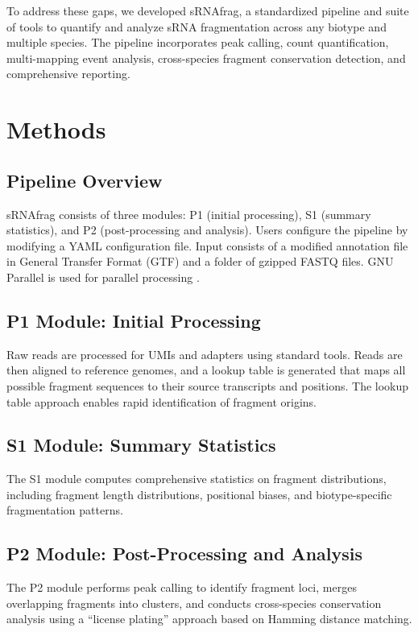 \documentclass{article}
\begin{document}
To address these gaps, we developed sRNAfrag, a standardized pipeline and suite of tools to quantify and analyze sRNA fragmentation across any biotype and multiple species. The pipeline incorporates peak calling, count quantification, multi-mapping event analysis, cross-species fragment conservation detection, and comprehensive reporting.

\section{Methods}

\subsection{Pipeline Overview}

sRNAfrag consists of three modules: P1 (initial processing), S1 (summary statistics), and P2 (post-processing and analysis). Users configure the pipeline by modifying a YAML configuration file. Input consists of a modified annotation file in General Transfer Format (GTF) and a folder of gzipped FASTQ files. GNU Parallel is used for parallel processing \citep{tange2011gnu}.

\subsection{P1 Module: Initial Processing}

Raw reads are processed for UMIs and adapters using standard tools. Reads are then aligned to reference genomes, and a lookup table is generated that maps all possible fragment sequences to their source transcripts and positions. The lookup table approach enables rapid identification of fragment origins.

\subsection{S1 Module: Summary Statistics}

The S1 module computes comprehensive statistics on fragment distributions, including fragment length distributions, positional biases, and biotype-specific fragmentation patterns.

\subsection{P2 Module: Post-Processing and Analysis}

The P2 module performs peak calling to identify fragment loci, merges overlapping fragments into clusters, and conducts cross-species conservation analysis using a ``license plating'' approach based on Hamming distance matching.
\end{document}
